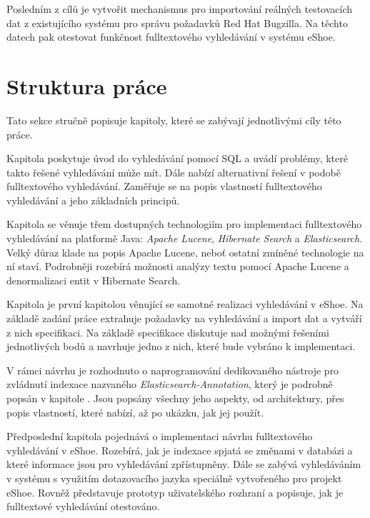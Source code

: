 \documentclass[11pt,oneside]{fithesis2}
\begin{document}
Posledním z cílů je vytvořit mechanismus pro importování reálných testovacích dat z existujícího systému pro správu požadavků Red Hat Bugzilla. Na těchto datech pak otestovat funkčnost fulltextového vyhledávání v systému eShoe.

\section{Struktura práce}
Tato sekce stručně popisuje kapitoly, které se zabývají jednotlivými cíly této práce.

Kapitola \textit{} poskytuje úvod do vyhledávání pomocí SQL a uvádí problémy, které takto řešené vyhledávání může mít. Dále nabízí alternativní řešení v podobě fulltextového vyhledávání. Zaměřuje se na popis vlastností fulltextového vyhledávání a jeho základních principů.

Kapitola \textit{} se věnuje třem dostupných technologiím pro implementaci fulltextového vyhledávání na platformě Java: \emph{Apache Lucene}, \emph{Hibernate Search} a \emph{Elasticsearch}. Velký důraz klade na popis Apache Lucene, neboť ostatní zmíněné technologie na ní staví. Podrobněji rozebírá možnosti analýzy textu pomocí Apache Lucene a denormalizaci entit v Hibernate Search.

Kapitola \textit{} je první kapitolou věnující se samotné realizaci vyhledávání v eShoe. Na základě zadání práce extrahuje požadavky na vyhledávání a import dat a vytváří z nich specifikaci. Na základě specifikace diskutuje nad možnými řešeními jednotlivých bodů a navrhuje jedno z nich, které bude vybráno k implementaci.

V rámci návrhu je rozhodnuto o naprogramování dedikovaného nástroje pro zvládnutí indexace nazvaného \emph{Elasticsearch-Annotation}, který je podrobně popsán v kapitole \textit{}. Jsou popsány všechny jeho aspekty, od architektury, přes popis vlastností, které nabízí, až po ukázku, jak jej použít.

Předposlední kapitola \textit{} pojednává o implementaci návrhu fulltextového vyhledávání v eShoe. Rozebírá, jak je indexace spjatá se změnami v databázi a které informace jsou pro vyhledávání zpřístupněny. Dále se zabývá vyhledáváním v systému s využitím dotazovacího jazyka speciálně vytvořeného pro projekt eShoe. Rovněž představuje prototyp uživatelského rozhraní a popisuje, jak je fulltextové vyhledávání otestováno.
\end{document}
